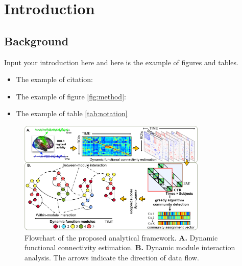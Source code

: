 \chapter{Introduction}

\section{Background}

Input your introduction here and here is the example of figures and tables.

\begin{itemize}
 \item	The example of citation:
	\cite{wu2024dynamic}
\item	The example of figure \autoref{fig:method}:
\item	The example of table \autoref{tab:notation}
\end{itemize}






\begin{figure}[th]
	\centering
	\includegraphics[width=0.8\textwidth]{Introduction/Pipeline.png}
	\caption{Flowchart of the proposed analytical framework.
		\textbf{A.} Dynamic functional connectivity estimation.
		\textbf{B.} Dynamic module interaction analysis. The arrows indicate the direction of data flow.
		\label{fig:method}}\vspace*{-2mm}
\end{figure}


